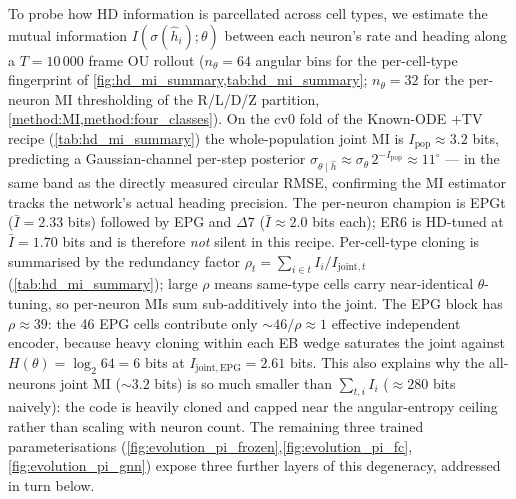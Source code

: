 \documentclass[11pt]{article}
\begin{document}
To probe how HD information is parcellated across cell types, we
estimate the mutual information $I(\sigma(\hat h_i); \theta)$
between each neuron's rate and heading along a $T = 10\,000$ frame
OU rollout ($n_\theta = 64$ angular bins for the per-cell-type
fingerprint of \cref{fig:hd_mi_summary,tab:hd_mi_summary};
$n_\theta = 32$ for the per-neuron MI thresholding of the R/L/D/Z
partition, \cref{method:MI,method:four_classes}). On the cv0 fold
of the Known-ODE $+$TV recipe (\cref{tab:hd_mi_summary})
the whole-population joint MI is $I_{\mathrm{pop}} \approx 3.2$
bits, predicting a Gaussian-channel per-step posterior
$\sigma_{\theta\mid\hat h} \approx \sigma_\theta\,2^{-I_{\mathrm{pop}}}
\approx 11^\circ$ --- in the same band as the directly measured
circular RMSE, confirming the MI estimator tracks the network's
actual heading precision. The per-neuron champion is EPGt
($\bar I = 2.33$ bits) followed by EPG and $\Delta 7$
($\bar I \approx 2.0$ bits each); ER6 is HD-tuned at $\bar I = 1.70$
bits and is therefore \emph{not} silent in this recipe. Per-cell-type
cloning is summarised by the redundancy factor
$\rho_t = \sum_{i \in t} I_i / I_{\mathrm{joint},t}$
(\cref{tab:hd_mi_summary}); large $\rho$ means same-type cells carry
near-identical $\theta$-tuning, so per-neuron MIs sum sub-additively
into the joint. The EPG block has $\rho \approx 39$:
the 46 EPG cells contribute only $\sim 46/\rho \approx 1$
effective independent encoder, because heavy cloning within each
EB wedge saturates the joint against
$H(\theta) = \log_2 64 = 6$ bits at $I_{\mathrm{joint},\mathrm{EPG}}
= 2.61$ bits. This also explains why the all-neurons joint MI
($\sim 3.2$ bits) is so much smaller than $\sum_{t,i} I_i$
($\approx 280$ bits naively): the code is heavily cloned and
capped near the angular-entropy ceiling rather than scaling with
neuron count.
The remaining three trained parameterisations
(\cref{fig:evolution_pi_frozen},\cref{fig:evolution_pi_fc},\cref{fig:evolution_pi_gnn})
expose three further layers of this degeneracy, addressed in turn
below.
\end{document}
